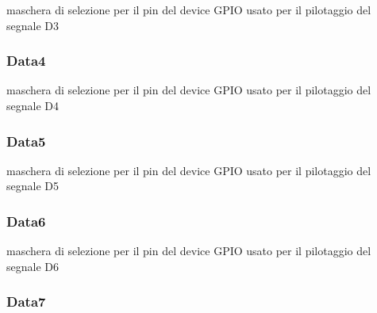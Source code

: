 maschera di selezione per il pin del device G\+P\+I\+O usato per il pilotaggio del segnale D3 \hypertarget{struct_h_d44780___l_c_d__t_a558b10ea85ca2ed99e34d38a2b4cf388}{
\subsubsection[{Data4}]{ Data4}}\label{struct_h_d44780___l_c_d__t_a558b10ea85ca2ed99e34d38a2b4cf388}
maschera di selezione per il pin del device G\+P\+I\+O usato per il pilotaggio del segnale D4 \hypertarget{struct_h_d44780___l_c_d__t_abebc68d092e3d1c115ecb22f7ac91f4b}{
\subsubsection[{Data5}]{ Data5}}\label{struct_h_d44780___l_c_d__t_abebc68d092e3d1c115ecb22f7ac91f4b}
maschera di selezione per il pin del device G\+P\+I\+O usato per il pilotaggio del segnale D5 \hypertarget{struct_h_d44780___l_c_d__t_aab366da5e8192bd7c5dd9194aa2d6fde}{
\subsubsection[{Data6}]{ Data6}}\label{struct_h_d44780___l_c_d__t_aab366da5e8192bd7c5dd9194aa2d6fde}
maschera di selezione per il pin del device G\+P\+I\+O usato per il pilotaggio del segnale D6 \hypertarget{struct_h_d44780___l_c_d__t_a0709183e63889cacaf3149c60ff6cb7d}{
\subsubsection[{Data7}]{ Data7}}\label{struct_h_d44780___l_c_d__t_a0709183e63889cacaf3149c60ff6cb7d}
